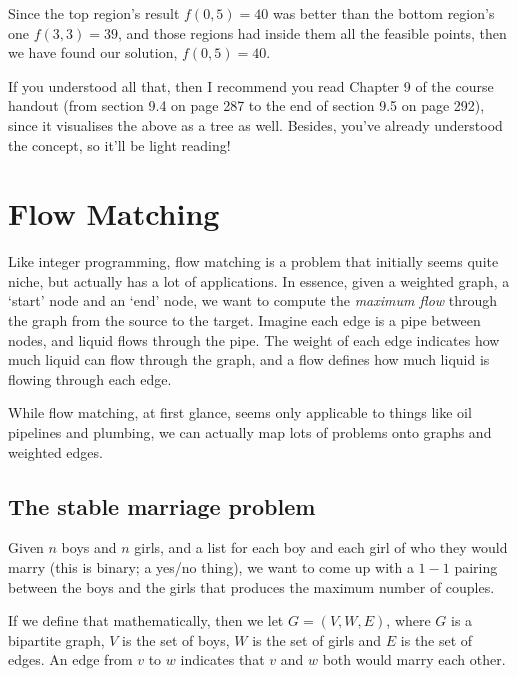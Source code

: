 \begin{enumerate}
  Since the top region's result $f(0,5) = 40$ was better than the bottom
  region's one $f(3,3) = 39$, and those regions had inside them all the
  feasible points, then we have found our solution, $f(0,5) = 40$.

  If you understood all that, then I recommend you read Chapter 9 of the course
  handout (from section 9.4 on page 287 to the end of section 9.5 on page 292),
  since it visualises the above as a tree as well. Besides, you've already
  understood the concept, so it'll be light reading!

\end{enumerate}

\section{Flow Matching}

Like integer programming, flow matching is a problem that initially seems quite
niche, but actually has a lot of applications. In essence, given a weighted
graph, a `start' node and an `end' node, we want to compute the \textit{maximum
flow} through the graph from the source to the target. Imagine each edge is a
pipe between nodes, and liquid flows through the pipe. The weight of each edge
indicates how much liquid can flow through the graph, and a flow defines how
much liquid is flowing through each edge.

While flow matching, at first glance, seems only applicable to things like oil
pipelines and plumbing, we can actually map lots of problems onto graphs and
weighted edges.

\subsection{The stable marriage problem}

Given $n$ boys and $n$ girls, and a list for each boy and each girl of who they
would marry (this is binary; a yes/no thing), we want to come up with a $1-1$
pairing between the boys and the girls that produces the maximum number of
couples.

If we define that mathematically, then we let $G = (V, W, E)$, where $G$ is a
bipartite graph, $V$ is the set of boys, $W$ is the set of girls and $E$ is the
set of edges. An edge from $v$ to $w$ indicates that $v$ and $w$ both would
marry each other.

